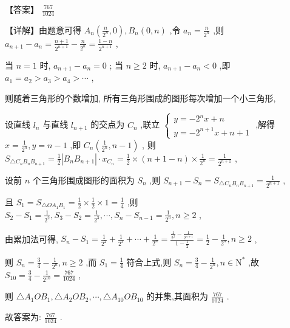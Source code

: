\documentclass[10pt]{article}
\begin{document}
【答案】 \(\frac{767}{1024}\)

【详解】由题意可得 \({A}_{n}\left( {\frac{n}{{2}^{n}},0}\right) ,{B}_{n}\left( {0,n}\right)\) ,令 \({a}_{n} = \frac{n}{{2}^{n}}\) ,则 \({a}_{n + 1} - {a}_{n} = \frac{n + 1}{{2}^{n + 1}} - \frac{n}{{2}^{n}} = \frac{1 - n}{{2}^{n + 1}}\) ,

当 \(n = 1\) 时, \({a}_{n + 1} - {a}_{n} = 0\) ; 当 \(n \geq  2\) 时, \({a}_{n + 1} - {a}_{n} < 0\) ,即 \({a}_{1} = {a}_{2} > {a}_{3} > {a}_{4} > \cdots\) ,

则随着三角形的个数增加, 所有三角形围成的图形每次增加一个小三角形,

设直线 \({l}_{n}\) 与直线 \({l}_{n + 1}\) 的交点为 \({C}_{n}\) ,联立 \(\left\{  \begin{array}{l} y =  - {2}^{n}x + n \\  y =  - {2}^{n + 1}x + n + 1 \end{array}\right.\) ,解得 \(x = \frac{1}{{2}^{n}},y = n - 1\) ,即 \({C}_{n}\left( {\frac{1}{{2}^{n}},n - 1}\right)\) , 则 \({S}_{\bigtriangleup {C}_{n}{B}_{n}{B}_{n + 1}} = \frac{1}{2}\left| {{B}_{n}{B}_{n + 1}}\right|  \cdot  {x}_{{C}_{n}} = \frac{1}{2} \times  \left( {n + 1 - n}\right)  \times  \frac{1}{{2}^{n}} = \frac{1}{{2}^{n + 1}}\) ,

设前 \(n\) 个三角形围成图形的面积为 \({S}_{n}\) ,则 \({S}_{n + 1} - {S}_{n} = {S}_{\bigtriangleup {C}_{n}{B}_{n}{B}_{n + 1}} = \frac{1}{{2}^{n + 1}}\) ,

且 \({S}_{1} = {S}_{\bigtriangleup O{A}_{1}{B}_{1}} = \frac{1}{2} \times  \frac{1}{2} \times  1 = \frac{1}{4}\) ,则 \({S}_{2} - {S}_{1} = \frac{1}{{2}^{2}},{S}_{3} - {S}_{2} = \frac{1}{{2}^{3}},\cdots ,{S}_{n} - {S}_{n - 1} = \frac{1}{{2}^{n}},n \geq  2\) ,

由累加法可得, \({S}_{n} - {S}_{1} = \frac{1}{{2}^{2}} + \frac{1}{{2}^{3}} + \cdots  + \frac{1}{{2}^{n}} = \frac{\frac{1}{{2}^{2}} - \frac{1}{{2}^{n + 1}}}{1 - \frac{1}{2}} = \frac{1}{2} - \frac{1}{{2}^{n}},n \geq  2\) ,

则 \({S}_{n} = \frac{3}{4} - \frac{1}{{2}^{n}},n \geq  2\) ,而 \({S}_{1} = \frac{1}{4}\) 符合上式,则 \({S}_{n} = \frac{3}{4} - \frac{1}{{2}^{n}},n \in  {\mathrm{N}}^{ * }\) ,故 \({S}_{10} = \frac{3}{4} - \frac{1}{{2}^{10}} = \frac{767}{1024}\) ,

则 \(\bigtriangleup  {A}_{1}O{B}_{1}, \bigtriangleup  {A}_{2}O{B}_{2},\cdots , \bigtriangleup  {A}_{10}O{B}_{10}\) 的并集,其面积为 \(\frac{767}{1024}\) .

故答案为: \(\frac{767}{1024}\) .
\end{document}
